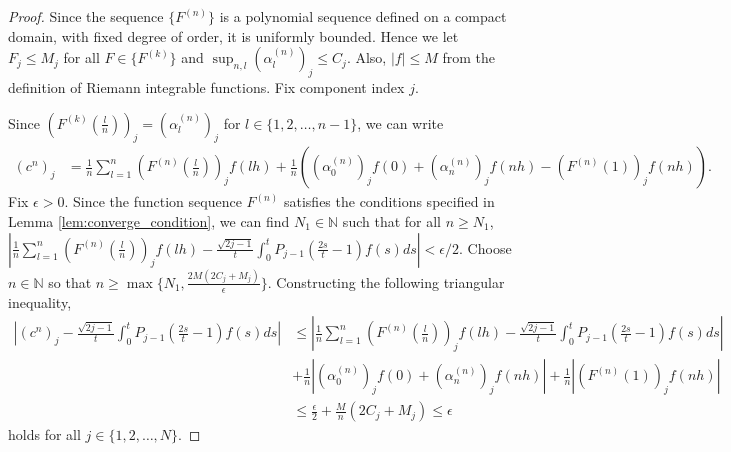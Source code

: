 \documentclass{article}
\theoremstyle{definition}
\newcommand{\pr}[1]{ \left( #1 \right) }
\begin{document}
\begin{proof}
    Since the sequence $\{F^{(n)}\}$ is a polynomial sequence defined on a compact domain, with fixed degree of order, it is uniformly bounded. 
    Hence we let $F_j \leq M_j$ for all $F \in \{F^{(k)}\}$ and $\sup_{n, l} \pr{\alpha^{(n)}_l}_j \leq C_j$.
    Also, $|f| \leq M$ from the definition of Riemann integrable functions. Fix component index $j$. 
    
    Since $\pr{F^{(k)}\pr{\frac{l}{n}}}_j = \pr{\alpha^{(n)}_l}_j$ for $l \in \{1, 2, \dots, n-1\}$, we can write
    \begin{align*}
        \pr{c^n}_j &= \frac{1}{n} \sum_{l=1}^n \pr{F^{(n)}\pr{\frac{l}{n}}}_j f(lh) + \frac{1}{n} \pr{\pr{\alpha^{(n)}_0}_j f(0) + \pr{\alpha^{(n)}_n}_j f(nh) - \pr{F^{(n)}(1)}_j f(nh)}.
    \end{align*}
    Fix $\epsilon >0$. 
    Since the function sequence $F^{(n)}$ satisfies the conditions specified in Lemma \ref{lem:converge_condition}, we can find $N_1 \in \mathbb{N}$ such that for all $n \geq N_1$, $\left| \frac{1}{n} \sum_{l=1}^n \pr{F^{(n)}\pr{\frac{l}{n}}}_j f(lh) - \frac{\sqrt{2j-1}}{t}\int_0^t P_{j-1}\pr{\frac{2s}{t}-1}f(s)ds \right| < \epsilon / 2$. Choose $n \in \mathbb{N}$ so that $n \geq \max\{N_1, \frac{2M(2C_j+M_j)}{\epsilon}\}$. Constructing the following triangular inequality,
    \begin{align*}
        \left| \pr{c^n}_j - \frac{\sqrt{2j-1}}{t}\int_0^t P_{j-1}\pr{\frac{2s}{t}-1}f(s)ds \right| 
        & \leq \left| \frac{1}{n} \sum_{l=1}^n \pr{F^{(n)}\pr{\frac{l}{n}}}_j f(lh) - \frac{\sqrt{2j-1}}{t}\int_0^t P_{j-1}\pr{\frac{2s}{t}-1}f(s)ds \right| \\
        &+ \frac{1}{n} \left| \pr{\alpha^{(n)}_0}_j f(0) + \pr{\alpha^{(n)}_n}_j f(nh) \right| + \frac{1}{n} \left| \pr{F^{(n)}(1)}_j f(nh) \right|\\
        &\leq \frac{\epsilon}{2} + \frac{M}{n}\pr{2C_j+M_j} 
        \leq \epsilon
    \end{align*}
    holds for all $j \in \{1, 2, \dots, N\}$. 
\end{proof}
\end{document}
